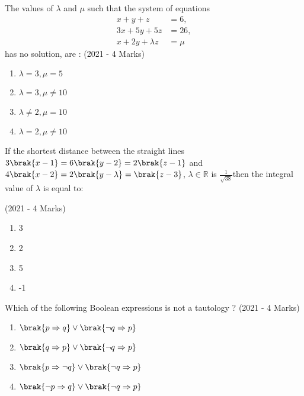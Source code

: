     \item{
            The values of $\lambda$ and $\mu$ such that the system of equations 
            \begin{align*}
            	x+y+z &= 6, \\
            	3x+5y+5z &= 26, \\
            	x + 2y + \lambda z &= \mu
            \end{align*}
            has no solution, are : \text{ }
             \hfill
                {(2021 - 4 Marks)}
            \begin{multicols}{4}
                \begin{enumerate}
                	\item $\lambda = 3, \mu = 5$
                    \item $\lambda = 3, \mu \neq 10$
                    \item $\lambda \neq 2, \mu = 10$
                    \item $\lambda = 2, \mu \neq 10$
                \end{enumerate}
            \end{multicols}

        
        }
    \item{
            If the shortest distance between the straight lines $3\brak{x-1}=6\brak{y-2}=2\brak{z-1}$ and $4\brak{x-2}=2\brak{y-\lambda}=\brak{z-3}$, $\lambda \in \mathbb{R}$ is $\frac{1}{\sqrt{38}}$then the integral value of $\lambda$ is equal to:
            
             \hfill
                {(2021 - 4 Marks)}
            \begin{multicols}{4}
                \begin{enumerate}
                	\item 3
                	\item 2
                	\item 5
                	\item -1
                \end{enumerate}
            \end{multicols}
        
        }
    \item{
            Which of the following Boolean expressions is not a tautology ?
             \hfill
                {(2021 - 4 Marks)}
			\begin{multicols}{2}
				\begin{enumerate}
					\item $\brak{p \Rightarrow q} \lor \brak{\neg q \Rightarrow p}$
					\item $\brak{q \Rightarrow p} \lor \brak{\neg q \Rightarrow p}$
					\item $\brak{p \Rightarrow \neg q} \lor \brak{\neg q \Rightarrow p}$
					\item $\brak{\neg p \Rightarrow q} \lor \brak{\neg q \Rightarrow p}$
				\end{enumerate}
			\end{multicols}
        
        }
